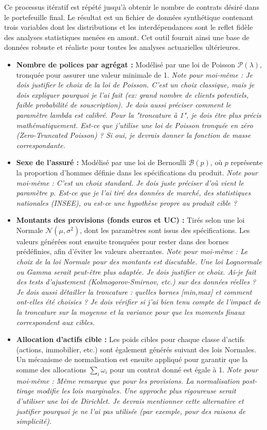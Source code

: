 Ce processus itératif est répété jusqu'à obtenir le nombre de contrats désiré dans le portefeuille final. Le résultat est un fichier de données synthétique contenant trois variables dont les distributions et les interdépendances sont le reflet fidèle des analyses statistiques menées en amont. Cet outil fournit ainsi une base de données robuste et réaliste pour toutes les analyses actuarielles ultérieures.

\begin{itemize}
    \item \textbf{Nombre de polices par agrégat :} Modélisé par une loi de Poisson $\mathcal{P}(\lambda)$, tronquée pour assurer une valeur minimale de 1. \textit{Note pour moi-même : Je dois justifier le choix de la loi de Poisson. C'est un choix classique, mais je dois expliquer pourquoi je l'ai fait (ex: grand nombre de clients potentiels, faible probabilité de souscription). Je dois aussi préciser comment le paramètre lambda est calibré. Pour la "troncature à 1", je dois être plus précis mathématiquement. Est-ce que j'utilise une loi de Poisson tronquée en zéro (Zero-Truncated Poisson) ? Si oui, je devrais donner la fonction de masse correspondante.}
    \item \textbf{Sexe de l'assuré :} Modélisé par une loi de Bernoulli $\mathcal{B}(p)$, où $p$ représente la proportion d'hommes définie dans les spécifications du produit. \textit{Note pour moi-même : C'est un choix standard. Je dois juste préciser d'où vient le paramètre p. Est-ce que je l'ai tiré des données de marché, des statistiques nationales (INSEE), ou est-ce une hypothèse propre au produit cible ?}
    \item \textbf{Montants des provisions (fonds euros et UC) :} Tirés selon une loi Normale $\mathcal{N}(\mu, \sigma^2)$, dont les paramètres sont issus des spécifications. Les valeurs générées sont ensuite tronquées pour rester dans des bornes prédéfinies, afin d'éviter les valeurs aberrantes. \textit{Note pour moi-même : Le choix de la loi Normale pour des montants est discutable. Une loi Lognormale ou Gamma serait peut-être plus adaptée. Je dois justifier ce choix. Ai-je fait des tests d'ajustement (Kolmogorov-Smirnov, etc.) sur des données réelles ? Je dois aussi détailler la troncature : quelles bornes [min,max] et comment ont-elles été choisies ? Je dois vérifier si j'ai bien tenu compte de l'impact de la troncature sur la moyenne et la variance pour que les moments finaux correspondent aux cibles.}
    \item \textbf{Allocation d'actifs cible :} Les poids cibles pour chaque classe d'actifs (actions, immobilier, etc.) sont également générés suivant des lois Normales. Un mécanisme de normalisation est ensuite appliqué pour garantir que la somme des allocations $\sum_{i} \omega_i$ pour un contrat donné est égale à 1. \textit{Note pour moi-même : Même remarque que pour les provisions. La normalisation post-tirage modifie les lois marginales. Une approche plus rigoureuse serait d'utiliser une loi de Dirichlet. Je devrais mentionner cette alternative et justifier pourquoi je ne l'ai pas utilisée (par exemple, pour des raisons de simplicité).}

\end{itemize}
